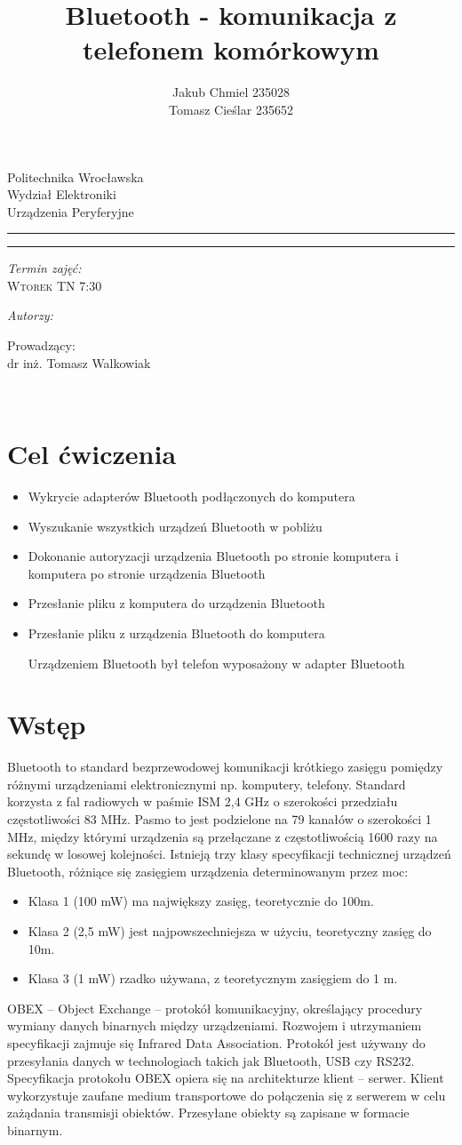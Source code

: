 \documentclass[12pt,a4paper,notitlepage]{report}
\author{ Jakub Chmiel  235028 \\ Tomasz Cieślar 235652}
\title{Bluetooth - komunikacja z telefonem komórkowym}
\makeatletter
\newcommand{\linia}{\rule{\linewidth}{0.4mm}}
\renewcommand{\maketitle}{\begin{titlepage}
    \vspace*{1cm}
    \begin{center}\small
    Politechnika Wrocławska\\
    Wydział Elektroniki\\
    Urządzenia Peryferyjne 
    \end{center}
    \vspace{4.5cm}
    \noindent\linia
    \begin{center}
      \LARGE \textsc{\@title}
         \end{center}
     \linia
    \vspace{0.5cm}
    \begin{flushright}
    \begin{minipage}{6cm}
    
     \vspace{1cm}
     \textit{\small Termin zajęć:}\\
     \normalsize \textsc{Wtorek TN 7:30} \par
	\vspace{0.3cm}    
    \textit{\small Autorzy:}\\
    \normalsize \textsc{\@author} \par
     \vspace{0.3cm}
        Prowadzący: \\ dr inż. Tomasz Walkowiak

    \end{minipage}
    \vspace{1cm}
     {\small }\\
       
     \end{flushright}
    \vspace*{\stretch{3}}
    \begin{center}
    \@date
    \end{center}
  \end{titlepage}%
}
\makeatother
\begin{document}
\maketitle

\newpage
\tableofcontents
\newpage
\renewcommand*\thesection{\arabic{section}}
\section{Cel ćwiczenia}
\begin{itemize}
\item Wykrycie adapterów Bluetooth podłączonych do komputera
\item Wyszukanie wszystkich urządzeń Bluetooth w pobliżu
\item Dokonanie autoryzacji urządzenia Bluetooth po stronie komputera i komputera po stronie urządzenia Bluetooth
\item Przesłanie pliku z komputera do urządzenia Bluetooth
\item Przesłanie pliku z urządzenia Bluetooth do komputera

Urządzeniem Bluetooth był telefon wyposażony w adapter Bluetooth
\end{itemize}

\section{Wstęp}
Bluetooth to standard bezprzewodowej komunikacji krótkiego zasięgu pomiędzy różnymi urządzeniami elektronicznymi np. komputery, telefony. Standard korzysta z fal radiowych w paśmie ISM 2,4 GHz o szerokości przedziału częstotliwości 83 MHz. Pasmo to jest podzielone na 79 kanałów o szerokości 1 MHz, między którymi urządzenia są przełączane z częstotliwością 1600 razy na sekundę w losowej kolejności. Istnieją trzy klasy specyfikacji technicznej urządzeń Bluetooth, różniące się zasięgiem urządzenia determinowanym przez moc:
\begin{itemize}
\item Klasa 1 (100 mW) ma największy zasięg, teoretycznie do 100m.
\item Klasa 2 (2,5  mW) jest najpowszechniejsza w użyciu, teoretyczny zasięg do 10m.
\item Klasa 3 (1 mW) rzadko używana, z teoretycznym zasięgiem do 1 m.
\end{itemize}

OBEX – Object Exchange – protokół komunikacyjny, określający procedury wymiany danych binarnych między urządzeniami. Rozwojem i utrzymaniem specyfikacji zajmuje się Infrared Data Association. Protokół jest używany do przesyłania danych w technologiach takich jak Bluetooth, USB czy RS232. Specyfikacja protokołu OBEX opiera się na architekturze klient – serwer. Klient wykorzystuje zaufane medium transportowe do połączenia się z serwerem w celu zażądania transmisji obiektów. Przesyłane obiekty są zapisane w formacie binarnym.
\end{document}
